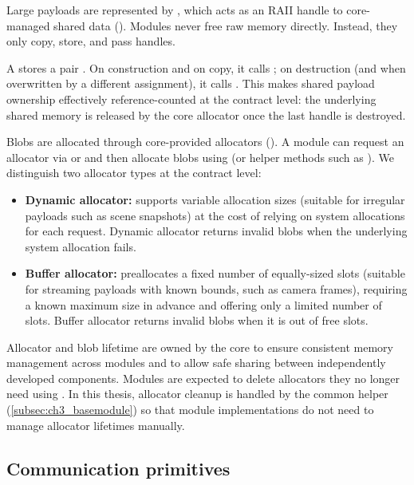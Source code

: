 Large payloads are represented by , which acts as an RAII handle to core-managed shared data (). Modules never free raw memory directly. Instead, they only copy, store, and pass  handles.

A  stores a pair . On construction and on copy, it calls ; on destruction (and when overwritten by a different assignment), it calls .
This makes shared payload ownership effectively reference-counted at the contract level: the underlying shared memory is released by the core allocator once the last  handle is destroyed.

Blobs are allocated through core-provided allocators (). A module can request an allocator via  or  and then allocate blobs using  (or helper methods such as ). We distinguish two allocator types at the contract level:
\begin{itemize}
    \item \textbf{Dynamic allocator:} supports variable allocation sizes (suitable for irregular payloads such as scene snapshots) at the cost of relying on system allocations for each request. Dynamic allocator returns invalid blobs when the underlying system allocation fails.
    \item \textbf{Buffer allocator:} preallocates a fixed number of equally-sized slots (suitable for streaming payloads with known bounds, such as camera frames), requiring a known maximum size in advance and offering only a limited number of slots. Buffer allocator returns invalid blobs when it is out of free slots.
\end{itemize}

Allocator and blob lifetime are owned by the core to ensure consistent memory management across modules and to allow safe sharing between independently developed components. Modules are expected to delete allocators they no longer need using . In this thesis, allocator cleanup is handled by the common  helper (\autoref{subsec:ch3_basemodule}) so that module implementations do not need to manage allocator lifetimes manually.


\subsection{Communication primitives} \label{subsec:ch3_comm_primitives}

